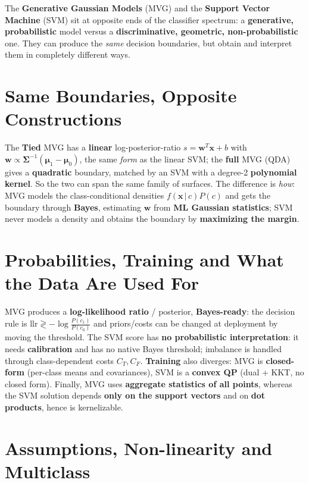The \textbf{Generative Gaussian Models} (MVG) and the \textbf{Support Vector Machine} (SVM) sit at opposite ends of the classifier spectrum: a \textbf{generative, probabilistic} model versus a \textbf{discriminative, geometric, non-probabilistic} one. They can produce the \emph{same} decision boundaries, but obtain and interpret them in completely different ways.

\section*{Same Boundaries, Opposite Constructions}

The \textbf{Tied} MVG has a \textbf{linear} log-posterior-ratio $s=\mathbf{w}^T\mathbf{x}+b$ with $\mathbf{w}\propto\boldsymbol\Sigma^{-1}(\boldsymbol\mu_1-\boldsymbol\mu_0)$, the same \emph{form} as the linear SVM; the \textbf{full} MVG (QDA) gives a \textbf{quadratic} boundary, matched by an SVM with a degree-2 \textbf{polynomial kernel}. So the two can span the same family of surfaces. The difference is \emph{how}: MVG models the class-conditional densities $f(\mathbf{x}\,|\,c)P(c)$ and gets the boundary through \textbf{Bayes}, estimating $\mathbf{w}$ from \textbf{ML Gaussian statistics}; SVM never models a density and obtains the boundary by \textbf{maximizing the margin}.

\section*{Probabilities, Training and What the Data Are Used For}

MVG produces a \textbf{log-likelihood ratio} / posterior, \textbf{Bayes-ready}: the decision rule is $\mathrm{llr}\gtrless-\log\frac{P(c_1)}{P(c_0)}$ and priors/costs can be changed at deployment by moving the threshold. The SVM score has \textbf{no probabilistic interpretation}: it needs \textbf{calibration} and has no native Bayes threshold; imbalance is handled through class-dependent costs $C_T,C_F$. \textbf{Training} also diverges: MVG is \textbf{closed-form} (per-class means and covariances), SVM is a \textbf{convex QP} (dual + KKT, no closed form). Finally, MVG uses \textbf{aggregate statistics of all points}, whereas the SVM solution depends \textbf{only on the support vectors} and on \textbf{dot products}, hence is kernelizable.

\section*{Assumptions, Non-linearity and Multiclass}

